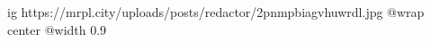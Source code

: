  
 
 
 
 

\ifcmt
  ig https://mrpl.city/uploads/posts/redactor/2pnmpbiagvhuwrdl.jpg
  @wrap center
  @width 0.9
\fi
